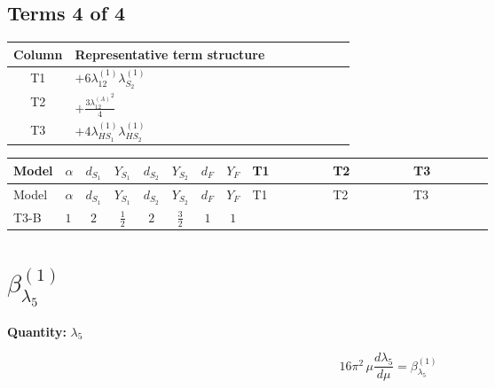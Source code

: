 \documentclass[8pt]{article}
\begin{document}
\begin{landscape}
\subsection*{Terms 4 of 4}
\begin{center}
\begin{tabular}{@{}c >{\raggedright\arraybackslash}p{0.82\linewidth}@{}}
\toprule
Column & Representative term structure \\
\midrule
T1 & \(\displaystyle +6 {\lambda_{12}^{(1)}} {\lambda_{S_2}^{(1)}}\) \\
\midrule
T2 & \(\displaystyle +\frac{3 {\lambda_{12}^{(A)}}^2}{4}\) \\
\midrule
T3 & \(\displaystyle +4 {\lambda_{HS_1}^{(1)}} {\lambda_{HS_2}^{(1)}}\) \\
\midrule
\bottomrule
\end{tabular}
\end{center}
\smallskip
\tiny
\begin{longtable}{@{}llcccccc >{\raggedright\arraybackslash}p{0.21\linewidth} >{\raggedright\arraybackslash}p{0.21\linewidth} >{\raggedright\arraybackslash}p{0.21\linewidth}@{}}
\toprule
Model & $\alpha$ & $d_{S_1}$ & $Y_{S_1}$ & $d_{S_2}$ & $Y_{S_2}$ & $d_F$ & $Y_F$ & T1 & T2 & T3 \\
\midrule
\endfirsthead
\toprule
Model & $\alpha$ & $d_{S_1}$ & $Y_{S_1}$ & $d_{S_2}$ & $Y_{S_2}$ & $d_F$ & $Y_F$ & T1 & T2 & T3 \\
\midrule
\endhead
T3-B & $1$ & $2$ & $\frac{1}{2}$ & $2$ & $\frac{3}{2}$ & $1$ & $1$ & \scriptsize\adjustbox{max width=\linewidth}{$\begin{gathered} +6 {\lambda_{12}^{(1)}} {\lambda_{S_2}^{(1)}}\end{gathered}$} & \scriptsize\adjustbox{max width=\linewidth}{$\begin{gathered} +\frac{3 {\lambda_{12}^{(A)}}^2}{4}\end{gathered}$} & \scriptsize\adjustbox{max width=\linewidth}{$\begin{gathered} +4 {\lambda_{HS_1}^{(1)}} {\lambda_{HS_2}^{(1)}}\end{gathered}$} \\
\midrule
\bottomrule
\end{longtable}
\clearpage
\section*{$\beta_{\lambda_5}^{(1)}$}
\noindent\textbf{Quantity: }$\lambda_5$\par\smallskip
\[16\pi^2\,\mu\frac{d \lambda_5}{d\mu}=\beta_{\lambda_5}^{(1)}\]

\end{landscape}
\end{document}
